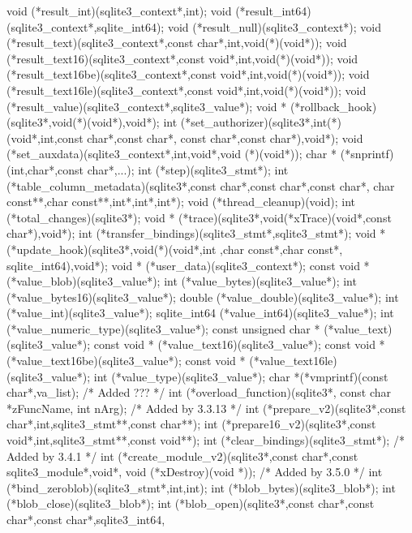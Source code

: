 \begin{Codex}[label=sqlite3ext.h,numbers=left]
{  void  (*result_int)(sqlite3_context*,int);
  void  (*result_int64)(sqlite3_context*,sqlite_int64);
  void  (*result_null)(sqlite3_context*);
  void  (*result_text)(sqlite3_context*,const char*,int,void(*)(void*));
  void  (*result_text16)(sqlite3_context*,const void*,int,void(*)(void*));
  void  (*result_text16be)(sqlite3_context*,const void*,int,void(*)(void*));
  void  (*result_text16le)(sqlite3_context*,const void*,int,void(*)(void*));
  void  (*result_value)(sqlite3_context*,sqlite3_value*);
  void * (*rollback_hook)(sqlite3*,void(*)(void*),void*);
  int  (*set_authorizer)(sqlite3*,int(*)(void*,int,const char*,const char*,
                         const char*,const char*),void*);
  void  (*set_auxdata)(sqlite3_context*,int,void*,void (*)(void*));
  char * (*snprintf)(int,char*,const char*,...);
  int  (*step)(sqlite3_stmt*);
  int  (*table_column_metadata)(sqlite3*,const char*,const char*,const char*,
                                char const**,char const**,int*,int*,int*);
  void  (*thread_cleanup)(void);
  int  (*total_changes)(sqlite3*);
  void * (*trace)(sqlite3*,void(*xTrace)(void*,const char*),void*);
  int  (*transfer_bindings)(sqlite3_stmt*,sqlite3_stmt*);
  void * (*update_hook)(sqlite3*,void(*)(void*,int ,char const*,char const*,
                                         sqlite_int64),void*);
  void * (*user_data)(sqlite3_context*);
  const void * (*value_blob)(sqlite3_value*);
  int  (*value_bytes)(sqlite3_value*);
  int  (*value_bytes16)(sqlite3_value*);
  double  (*value_double)(sqlite3_value*);
  int  (*value_int)(sqlite3_value*);
  sqlite_int64  (*value_int64)(sqlite3_value*);
  int  (*value_numeric_type)(sqlite3_value*);
  const unsigned char * (*value_text)(sqlite3_value*);
  const void * (*value_text16)(sqlite3_value*);
  const void * (*value_text16be)(sqlite3_value*);
  const void * (*value_text16le)(sqlite3_value*);
  int  (*value_type)(sqlite3_value*);
  char *(*vmprintf)(const char*,va_list);
  /* Added ??? */
  int (*overload_function)(sqlite3*, const char *zFuncName, int nArg);
  /* Added by 3.3.13 */
  int (*prepare_v2)(sqlite3*,const char*,int,sqlite3_stmt**,const char**);
  int (*prepare16_v2)(sqlite3*,const void*,int,sqlite3_stmt**,const void**);
  int (*clear_bindings)(sqlite3_stmt*);
  /* Added by 3.4.1 */
  int (*create_module_v2)(sqlite3*,const char*,const sqlite3_module*,void*,
                          void (*xDestroy)(void *));
  /* Added by 3.5.0 */
  int (*bind_zeroblob)(sqlite3_stmt*,int,int);
  int (*blob_bytes)(sqlite3_blob*);
  int (*blob_close)(sqlite3_blob*);
  int (*blob_open)(sqlite3*,const char*,const char*,const char*,sqlite3_int64,
}
\end{Codex}
